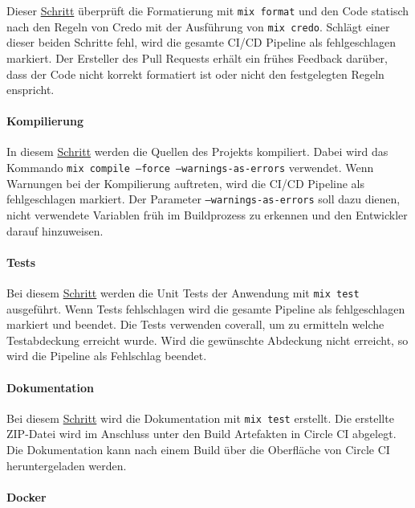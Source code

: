 Dieser \hyperref[lst:circle_job_check_code]{Schritt} überprüft die Formatierung mit \texttt{mix format} und den Code statisch nach den Regeln von Credo mit der Ausführung von \texttt{mix credo}.
Schlägt einer dieser beiden Schritte fehl, wird die gesamte CI/CD Pipeline als fehlgeschlagen markiert.
Der Ersteller des Pull Requests erhält ein frühes Feedback darüber, dass der Code nicht korrekt formatiert ist oder nicht den festgelegten Regeln enspricht.

\paragraph{Kompilierung}

In diesem \hyperref[lst:circle_job_build]{Schritt} werden die Quellen des Projekts kompiliert.
Dabei wird das Kommando \texttt{mix compile --force --warnings-as-errors} verwendet.
Wenn Warnungen bei der Kompilierung auftreten, wird die CI/CD Pipeline als fehlgeschlagen markiert.
Der Parameter \texttt{--warnings-as-errors} soll dazu dienen, nicht verwendete Variablen früh im Buildprozess zu erkennen und den Entwickler darauf hinzuweisen.

\paragraph{Tests}

Bei diesem \hyperref[lst:circle_job_test]{Schritt} werden die Unit Tests der Anwendung mit \texttt{mix test} ausgeführt.
Wenn Tests fehlschlagen wird die gesamte Pipeline als fehlgeschlagen markiert und beendet.
Die Tests verwenden coverall, um zu ermitteln welche Testabdeckung erreicht wurde.
Wird die gewünschte Abdeckung nicht erreicht, so wird die Pipeline als Fehlschlag beendet.

\paragraph{Dokumentation}

Bei diesem \hyperref[lst:circle_job_documentation]{Schritt} wird die Dokumentation mit \texttt{mix test} erstellt.
Die erstellte ZIP-Datei wird im Anschluss unter den Build Artefakten in Circle CI abgelegt.
Die Dokumentation kann nach einem Build über die Oberfläche von Circle CI heruntergeladen werden.

\paragraph{Docker}

